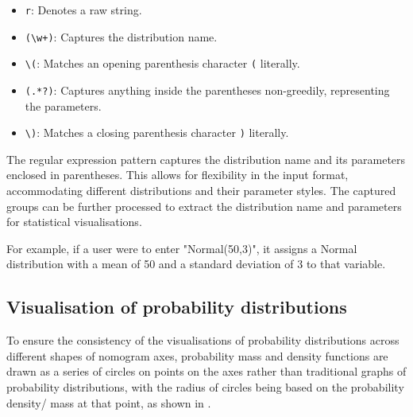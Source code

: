\documentclass{l4proj}
\begin{document}
\begin{itemize}
  \item \texttt{r}: Denotes a raw string. 
  \item \texttt{(\textbackslash w+)}: Captures the distribution name.
  \item \texttt{\textbackslash(}: Matches an opening parenthesis character \texttt{(} literally.
  \item \texttt{(.*?)}: Captures anything inside the parentheses non-greedily, representing the parameters.
  \item \texttt{\textbackslash)}: Matches a closing parenthesis character \texttt{)} literally.
\end{itemize}

The regular expression pattern captures the distribution name and its parameters enclosed in parentheses. This allows for flexibility in the input format, accommodating different distributions and their parameter styles. The captured groups can be further processed to extract the distribution name and parameters for statistical visualisations.

For example, if a user were to enter "Normal(50,3)", it assigns a Normal distribution with a mean of 50 and a standard deviation of 3 to that variable. 

\subsection{Visualisation of probability distributions}

To ensure the consistency of the visualisations of probability distributions across different shapes of nomogram axes, probability mass and density functions are drawn as a series of circles on points on the axes rather than traditional graphs of probability distributions, with the radius of circles being based on the probability density/ mass at that point, as shown in  . 
\end{document}
